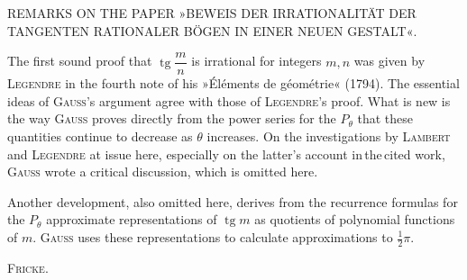 
\begin{center}\small
REMARKS ON THE PAPER »BEWEIS DER IRRATIONALITÄT DER TANGENTEN
RATIONALER BÖGEN IN EINER NEUEN GESTALT«.
\end{center}
\par\noindent\hspace*{\parindent}The first sound proof that $\operatorname{tg}\dfrac{m}{n}$ is irrational for integers
$m, n$ was given by \textsc{Legendre} in the fourth note of his »Éléments
de géométrie« (1794). The essential ideas of \textsc{Gauss}'s argument agree with
those of \textsc{Legendre}'s proof. What is new is the way
\textsc{Gauss} proves directly from the power series for the $P_\theta$ that these
quantities continue to decrease as $\theta$ increases. On the investigations
by \textsc{Lambert} and \textsc{Legendre} at issue here, especially on the latter's
account in\,the\,cited work, \textsc{Gauss} wrote a critical
discussion, which is omitted here.

Another development, also omitted here, derives from the
recurrence formulas for the $P_\theta$ approximate representations of $\operatorname{tg} m$
as quotients of polynomial functions of $m$. \textsc{Gauss} uses these
representations to calculate approximations to $\tfrac{1}{2}\pi$.

\begin{flushright}
\textsc{Fricke}.
\end{flushright}
